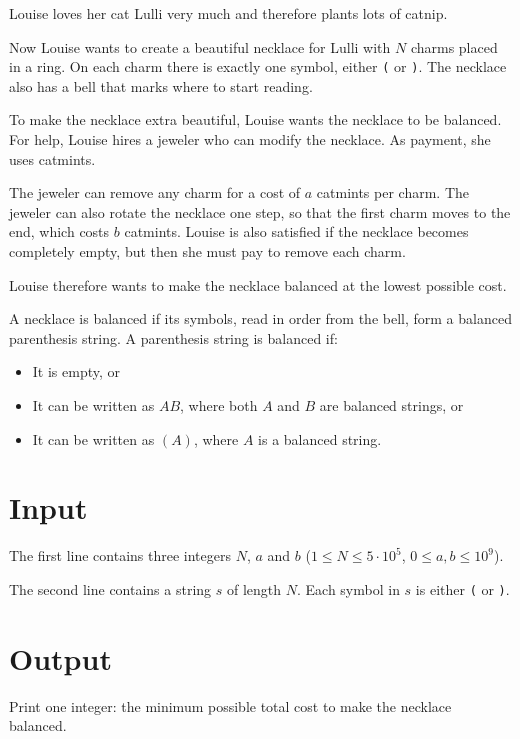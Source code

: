 \noindent


Louise loves her cat Lulli very much and therefore plants lots of catnip.

Now Louise wants to create a beautiful necklace for Lulli with $N$ charms placed in a ring.
On each charm there is exactly one symbol, either \texttt{(} or \texttt{)}.
The necklace also has a bell that marks where to start reading.

To make the necklace extra beautiful, Louise wants the necklace to be balanced.
For help, Louise hires a jeweler who can modify the necklace. As payment, she uses catmints.

The jeweler can remove any charm for a cost of $a$ catmints per charm.
The jeweler can also rotate the necklace one step, so that the first charm moves to the end, which costs $b$ catmints.
Louise is also satisfied if the necklace becomes completely empty, but then she must pay to remove each charm.

Louise therefore wants to make the necklace balanced at the lowest possible cost.

A necklace is balanced if its symbols, read in order from the bell, form a balanced parenthesis string.
A parenthesis string is balanced if:
\begin{itemize}
    \item It is empty, or
    \item It can be written as $AB$, where both $A$ and $B$ are balanced strings, or
    \item It can be written as $(A)$, where $A$ is a balanced string.
\end{itemize}


\section*{Input}
The first line contains three integers $N$, $a$ and $b$ ($1 \leq N \leq 5 \cdot 10^5$, $0 \leq a,b \leq 10^9$).

The second line contains a string $s$ of length $N$.
Each symbol in $s$ is either \texttt{(} or \texttt{)}.

\section*{Output}
Print one integer: the minimum possible total cost to make the necklace balanced.


